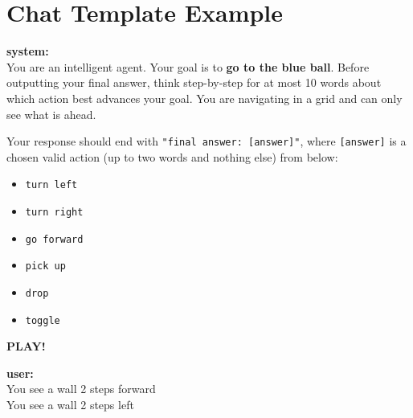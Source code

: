 \documentclass[11pt,a4paper]{article}
\begin{document}
\section{Chat Template Example}
\label{appendix:chat_template}
\begin{tcolorbox}[
  enhanced,
  title={Chat Template for Reasoning},
  fonttitle=\bfseries,
  colback=white,
  colframe=black!70,
  boxrule=1pt,
  arc=3pt,
  outer arc=3pt,
  top=4pt,
  bottom=4pt,
  left=6pt,
  right=6pt,
  boxsep=4pt
]

  \begin{tcolorbox}[
    enhanced,
    colback=gray!10,
    colframe=black!80,
    boxrule=0.5pt,
    arc=2pt,
    outer arc=2pt,
    top=2pt,
    bottom=2pt,
    left=4pt,
    right=4pt,
    boxsep=2pt
  ]
    \textbf{system:}\\[4pt]
    You are an intelligent agent. Your goal is to \textbf{go to the blue ball}. 
    Before outputting your final answer, think step-by-step for at most 10 words 
    about which action best advances your goal. You are navigating in a grid and 
    can only see what is ahead.

    Your response should end with \texttt{"final answer: [answer]"}, where \texttt{[answer]} 
    is a chosen valid action (up to two words and nothing else) from below:

    \begin{itemize}[leftmargin=1.5em, itemsep=0pt, parsep=0pt, topsep=2pt]
      \item \texttt{turn left}
      \item \texttt{turn right}
      \item \texttt{go forward}
      \item \texttt{pick up}
      \item \texttt{drop}
      \item \texttt{toggle}
    \end{itemize}

    \textbf{PLAY!}
  \end{tcolorbox}

  \begin{tcolorbox}[
    enhanced,
    colback=green!5,
    colframe=green!50!black,
    boxrule=0.5pt,
    arc=2pt,
    outer arc=2pt,
    top=2pt,
    bottom=2pt,
    left=4pt,
    right=4pt,
    boxsep=2pt
  ]
    \textbf{user:}\\[4pt]
    You see a wall 2 steps forward \\
    You see a wall 2 steps left
  \end{tcolorbox}


\end{tcolorbox}
\end{document}
